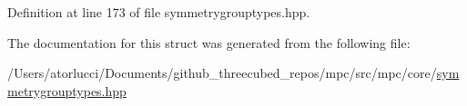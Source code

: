 Definition at line 173 of file symmetrygrouptypes.\+hpp.



The documentation for this struct was generated from the following file\+:\begin{DoxyCompactItemize}
\item 
/\+Users/atorlucci/\+Documents/github\+\_\+threecubed\+\_\+repos/mpc/src/mpc/core/\mbox{\hyperlink{symmetrygrouptypes_8hpp}{symmetrygrouptypes.\+hpp}}\end{DoxyCompactItemize}
